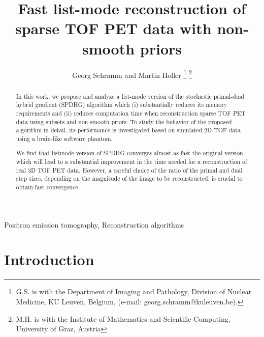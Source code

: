 \documentclass{IEEEtran}
\begin{document}
\title{Fast list-mode reconstruction of sparse TOF PET data with non-smooth priors} 
\author{Georg Schramm and Martin Holler
\thanks{G.S. is with the Department of Imaging and Pathology, Division of Nuclear Medicine,
KU Leuven, Belgium, (e-mail: georg.schramm@kuleuven.be).}
\thanks{M.H. is with the Institute of Mathematics and Scientific Computing, 
University of Graz, Austria}
}

\maketitle

\begin{abstract}
In this work, we propose and analyze a list-mode version of the stochastic primal-dual hybrid gradient
(SPDHG) algorithm which (i) substantially reduces its memory requirements and (ii) reduces
computation time when reconstruction sparse TOF PET data using subsets and non-smooth priors. 
To study the behavior of the proposed algorithm in detail, its performance 
is investigated based on simulated 2D TOF data using a brain-like software phantom.

We find that listmode-version of SPDHG converges almost as fast the original version
which will lead to a substantial improvement in the time needed for a reconstruction
of real 3D TOF PET data.
However, a careful choice of the ratio of the primal and dual step sizes, 
depending on the magnitude of the image to be reconstructed, is crucial to obtain fast convergence.
\end{abstract}

\begin{IEEEkeywords}
Positron emission tomography, Reconstruction algorithms
\end{IEEEkeywords}

\section{Introduction}
\end{document}
